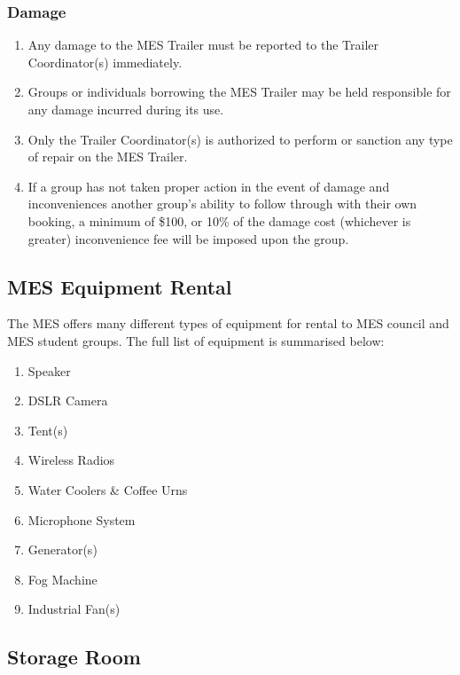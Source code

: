 \subsubsection{Damage}
\label{damage}

\begin{enumerate}
 \item
  Any damage to the MES Trailer must be reported to the Trailer Coordinator(s) immediately.
 \item
  Groups or individuals borrowing the MES Trailer may be held responsible for any damage incurred during its use.
 \item
  Only the Trailer Coordinator(s) is authorized to perform or sanction any type of repair on the MES Trailer.
 \item
  If a group has not taken proper action in the event of damage and inconveniences another group's ability to follow through with their own booking, a minimum of \$100, or 10\% of the damage cost (whichever is greater) inconvenience fee will be imposed upon the group.

\end{enumerate}

\subsection{MES Equipment Rental}
\label{mes-equipment-rental}
The MES offers many different types of equipment for rental to MES
council and MES student groups. The full list of equipment is
summarised below: %

\begin{enumerate}
 \item
  Speaker
 \item
  DSLR Camera
 \item
  Tent(s)  
 \item
  Wireless Radios 
 \item
  Water Coolers \& Coffee Urns 
 \item
  Microphone System  
 \item    
  Generator(s)   
 \item    
  Fog Machine   
 \item    
  Industrial Fan(s) 
\end{enumerate}

\subsection{Storage Room}
\label{storage-room}

